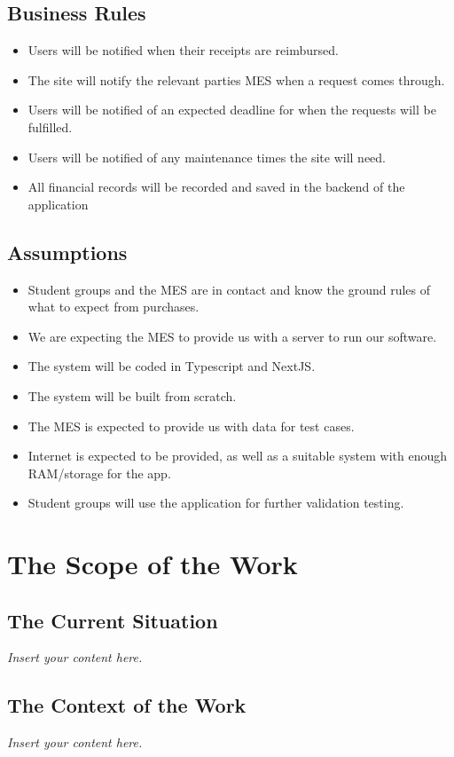 \documentclass[12pt]{article}
\newcommand{\lips}{\textit{Insert your content here.}}
\begin{document}
\subsection{Business Rules}
\begin{itemize}
  \item Users will be notified when their receipts are reimbursed.
  \item The site will notify the relevant parties MES when a request comes through.
  \item Users will be notified of an expected deadline for when the requests will be fulfilled.
  \item Users will be notified of any maintenance times the site will need.
  \item All financial records will be recorded and saved in the backend of the application 
\end{itemize}

\subsection{Assumptions}
\begin{itemize}
  \item Student groups and the MES are in contact and know the ground rules of what to expect from purchases.
  \item We are expecting the MES to provide us with a server to run our software.
  \item The system will be coded in Typescript and NextJS.
  \item The system will be built from scratch.
  \item The MES is expected to provide us with data for test cases.
  \item Internet is expected to be provided, as well as a suitable system with enough RAM/storage for the app. 
  \item Student groups will use the application for further validation testing. 
\end{itemize}

\section{The Scope of the Work}
\subsection{The Current Situation}
\lips
\subsection{The Context of the Work}
\lips
\end{document}
